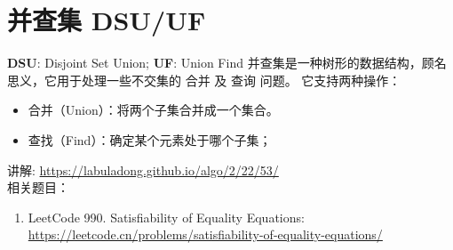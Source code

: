 


\section{并查集 DSU/UF}
\textbf{DSU}: Disjoint Set Union; \textbf{UF}: Union Find
并查集是一种树形的数据结构，顾名思义，它用于处理一些不交集的 合并 及 查询 问题。 它支持两种操作： 

\begin{itemize}
    \item 合并（Union）：将两个子集合并成一个集合。
    \item 查找（Find）：确定某个元素处于哪个子集；
\end{itemize}



\ifshowLink
讲解: \href{https://labuladong.github.io/algo/2/22/53/}{https://labuladong.github.io/algo/2/22/53/}\\
相关题目：
    \begin{enumerate}
        \item LeetCode 990. Satisfiability of Equality Equations: \href{https://leetcode.cn/problems/satisfiability-of-equality-equations/}{https://leetcode.cn/problems/satisfiability-of-equality-equations/}
    \end{enumerate}
\fi